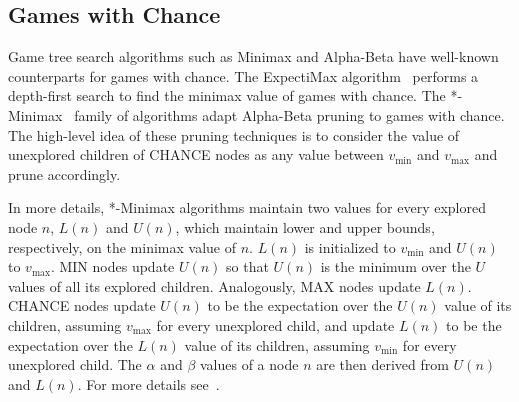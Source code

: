\documentclass[letterpaper]{article} %
\newcommand{\pess}{\mathit{L}}
\newcommand{\opti}{\mathit{U}}
\newcommand{\vmax}{v_{\text{max}}}
\newcommand{\vmin}{v_{\text{min}}}
\begin{document}
\subsection{Games with Chance}
Game tree search algorithms such as Minimax and Alpha-Beta have well-known counterparts for games with chance.
The ExpectiMax algorithm~\cite{michie1966game} performs a depth-first search to find the minimax value of games with chance.
The *-Minimax~\cite{ballard1983minimax} family of algorithms adapt Alpha-Beta pruning to games with chance. The high-level idea of these pruning techniques is to consider the value of unexplored children of CHANCE nodes as any value between $\vmin$ and $\vmax$ and prune accordingly. 

In more details, *-Minimax algorithms maintain two values for every explored node $n$, $\pess(n)$ and $\opti(n)$, which maintain lower and upper bounds, respectively, on the minimax value of $n$. 
$\pess(n)$ is initialized to $\vmin$ and $\opti(n)$ to $\vmax$. 
MIN nodes update $\opti(n)$ so that $\opti(n)$ is the minimum over the $\opti$ values of all its explored children. Analogously, MAX nodes update $\pess(n)$. CHANCE nodes update $\opti(n)$ to be the expectation over the $\opti(n)$ value of its children, assuming $\vmax{}$ for every unexplored child, and update $\pess(n)$ to be the expectation over the $\pess(n)$ value of its children, assuming $\vmin{}$ for every unexplored child. 
The $\alpha$ and $\beta$ values of a node $n$ are then derived from $\opti(n)$ and $\pess(n)$. For more details see~\cite{hauk2004rediscovering}. 

\end{document}
